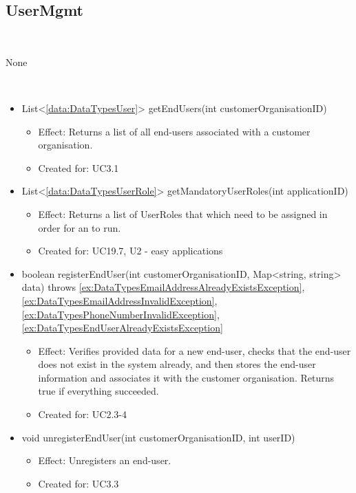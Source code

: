   \subsection{UserMgmt}\label{int:OnlineServiceOnlineServiceCustomerOrganisationFacadeUserMgmt}
    \begin{description}
      \item[Provided by:] \iconcomponent{}~
      \item[Required by:] None
      \item[Operations:] ~
    \begin{itemize}[noitemsep,nolistsep,leftmargin=-.25cm]
      \item \textsf{List\textless{}\ref{data:DataTypesUser}\textgreater{} getEndUsers(int customerOrganisationID)}
        \begin{itemize}[noitemsep,nolistsep]
           \item Effect: Returns a list of all end-users associated with a customer organisation.
\item Created for: UC3.1
        \end{itemize}
      \item \textsf{List\textless{}\ref{data:DataTypesUserRole}\textgreater{} getMandatoryUserRoles(int applicationID)}
        \begin{itemize}[noitemsep,nolistsep]
           \item Effect: Returns a list of UserRoles that which need to be assigned in order for an
 to run.
\item Created for: UC19.7, U2 - easy applications
        \end{itemize}
      \item \textsf{boolean registerEndUser(int customerOrganisationID, Map\textless{}string, string\textgreater{} data) throws \ref{ex:DataTypesEmailAddressAlreadyExistsException}, \ref{ex:DataTypesEmailAddressInvalidException}, \ref{ex:DataTypesPhoneNumberInvalidException}, \ref{ex:DataTypesEndUserAlreadyExistsException}}
        \begin{itemize}[noitemsep,nolistsep]
           \item Effect: Verifies provided data for a new end-user, checks that the end-user does not exist in the system already, and then stores the end-user information and associates it with the customer organisation. Returns true if everything succeeded.
\item Created for: UC2.3-4
        \end{itemize}
      \item \textsf{void unregisterEndUser(int customerOrganisationID, int userID)}
        \begin{itemize}[noitemsep,nolistsep]
           \item Effect: Unregisters an end-user.
\item Created for: UC3.3
        \end{itemize}
    \end{itemize}
    \end{description}

